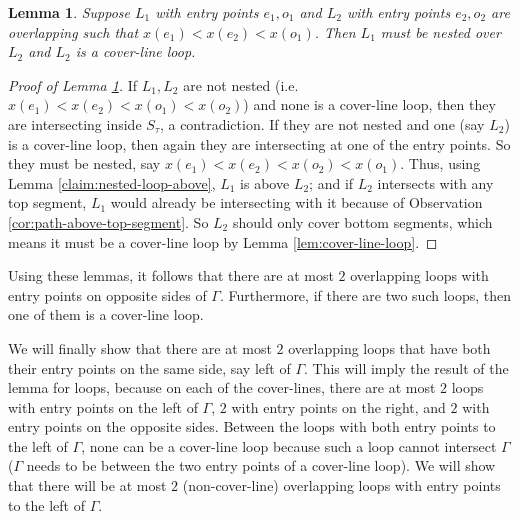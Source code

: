 \documentclass[10pt,a4paper]{amsart}
\theoremstyle{thmstyleone}
\newtheorem{lemma}{Lemma}
\begin{document}
\begin{lemma}\label{claim:loop-above-loop}
    Suppose $L_1$ with entry points $e_1,o_1$ and $L_2$ with  entry points $e_2,o_2$
    are overlapping such that $x(e_1)<x(e_2)<x(o_1)$. Then $L_1$ must be nested over $L_2$ and
    $L_2$ is a cover-line loop. 
\end{lemma}
\begin{proof}[Proof of Lemma \ref{claim:loop-above-loop}]
    If $L_1,L_2$ are not nested (i.e. $x(e_1)<x(e_2)<x(o_1)<x(o_2)$) and none is a cover-line loop, then they are intersecting inside $S_\tau$, a contradiction.
    If they are not nested and one (say $L_2$) is a cover-line loop, then again they are intersecting at one of the entry  points. So they must be nested, 
    say $x(e_1)<x(e_2)<x(o_2)<x(o_1)$. Thus, using Lemma \ref{claim:nested-loop-above}, $L_1$ is above $L_2$; and if $L_2$ intersects with any top segment, $L_1$ would already be intersecting with it because of Observation \ref{cor:path-above-top-segment}. So $L_2$ should only cover bottom segments, which means it
    must be a cover-line loop by Lemma \ref{lem:cover-line-loop}.
\end{proof}

	Using these lemmas, it follows that there are at most $2$ overlapping loops with entry points on opposite sides of $\Gamma$. Furthermore, if there are two such loops, then one of them is a cover-line loop.    
    
    We will finally show that there are at most $2$ overlapping loops that have both their entry points on the same side, say left of $\Gamma$. This will imply the result of the lemma for loops, because on each of the cover-lines, there are at most $2$ loops with entry points on the left of $\Gamma$, $2$ with entry points on the right, and $2$ with entry points on the opposite sides.
    Between the loops with both entry points to the left of $\Gamma$, none can be a cover-line loop because such a loop cannot intersect $\Gamma$ ($\Gamma$ needs to be between the two entry points of a cover-line loop). We will show that there will be at most $2$ (non-cover-line) overlapping loops with entry points to the left of $\Gamma$.
    
\end{document}
